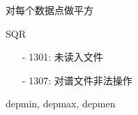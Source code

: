 \label{cmd:sqr}

对每个数据点做平方

\begin{SACSTX}
SQR
\end{SACSTX}

\begin{itemize}
\item[-]1301: 未读入文件
\item[-]1307: 对谱文件非法操作
\end{itemize}

depmin, depmax, depmen
